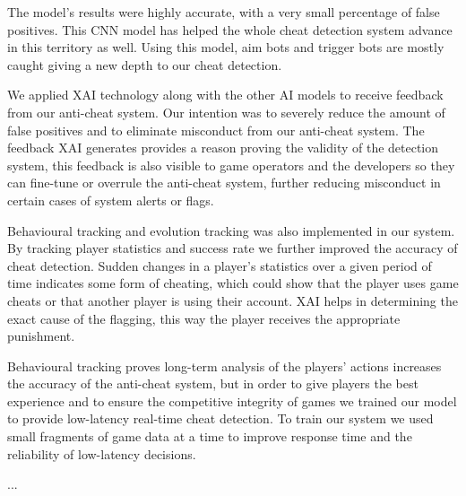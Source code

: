 The model's results were highly accurate, with a very small percentage of false positives. This CNN model has helped the whole cheat detection system advance in this territory as well. Using this model, aim bots and trigger bots are mostly caught giving a new depth to our cheat detection.

We applied XAI technology along with the other AI models to receive feedback from our anti-cheat system. Our intention was to severely reduce the amount of false positives and to eliminate misconduct from our anti-cheat system. The feedback XAI generates provides a reason proving the validity of the detection system, this feedback is also visible to game operators and the developers so they can fine-tune or overrule the anti-cheat system, further reducing misconduct in certain cases of system alerts or flags.

Behavioural tracking and evolution tracking was also implemented in our system. By tracking player statistics and success rate we further improved the accuracy of cheat detection. Sudden changes in a player’s statistics over a given period of time indicates some form of cheating, which could show that the player uses game cheats or that another player is using their account. XAI helps in determining the exact cause of the flagging, this way the player receives the appropriate punishment. 

Behavioural tracking proves long-term analysis of the players’ actions increases the accuracy of the anti-cheat system, but in order to give players the best experience and to ensure the competitive integrity of games we trained our model to provide low-latency real-time cheat detection. To train our system we used small fragments of game data at a time to improve response time and the reliability of low-latency decisions.

...